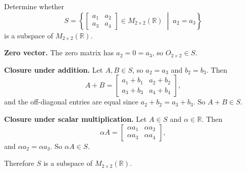 \begin{example}
Determine whether
\[
S = \left\{ \begin{bmatrix} a_1 & a_2 \\ a_3 & a_4 \end{bmatrix} \in M_{2\times 2}(\mathbb{R}) \;\middle|\; a_2 = a_3 \right\}
\]
is a subspace of $M_{2\times 2}(\mathbb{R})$.

\begin{solution}
\textbf{Zero vector.} The zero matrix has $a_2 = 0 = a_3$, so $O_{2\times 2} \in S$.

\medskip
\textbf{Closure under addition.} Let $A, B \in S$, so $a_2 = a_3$ and $b_2 = b_3$. Then
\[
A + B = \begin{bmatrix} a_1 + b_1 & a_2 + b_2 \\ a_3 + b_3 & a_4 + b_4 \end{bmatrix},
\]
and the off-diagonal entries are equal since $a_2 + b_2 = a_3 + b_3$. So $A + B \in S$.

\medskip
\textbf{Closure under scalar multiplication.} Let $A \in S$ and $\alpha \in \mathbb{R}$. Then
\[
\alpha A = \begin{bmatrix} \alpha a_1 & \alpha a_2 \\ \alpha a_3 & \alpha a_4 \end{bmatrix},
\]
and $\alpha a_2 = \alpha a_3$. So $\alpha A \in S$.

Therefore $S$ is a subspace of $M_{2\times 2}(\mathbb{R})$.
\end{solution}
\end{example}

